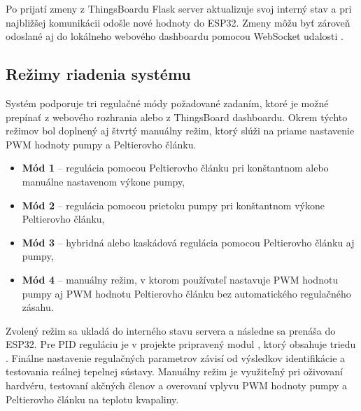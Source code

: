 Po prijatí zmeny z ThingsBoardu Flask server aktualizuje svoj interný stav a pri 
najbližšej komunikácii odošle nové hodnoty do ESP32. Zmeny môžu byť zároveň odoslané 
aj do lokálneho webového dashboardu pomocou WebSocket udalosti .

\subsection{Režimy riadenia systému}

Systém podporuje tri regulačné módy požadované zadaním, ktoré je možné prepínať z webového 
rozhrania alebo z ThingsBoard dashboardu. Okrem týchto režimov bol doplnený aj štvrtý 
manuálny režim, ktorý slúži na priame nastavenie PWM hodnoty pumpy a Peltierovho článku.

\begin{itemize}
    \item \textbf{Mód 1} -- regulácia pomocou Peltierovho článku pri konštantnom alebo manuálne nastavenom výkone pumpy,
    \item \textbf{Mód 2} -- regulácia pomocou prietoku pumpy pri konštantnom výkone Peltierovho článku,
    \item \textbf{Mód 3} -- hybridná alebo kaskádová regulácia pomocou Peltierovho článku aj pumpy,
    \item \textbf{Mód 4} -- manuálny režim, v ktorom používateľ nastavuje PWM hodnotu pumpy aj PWM hodnotu Peltierovho článku bez automatického regulačného zásahu.
\end{itemize}

Zvolený režim sa ukladá do interného stavu servera a následne sa prenáša do ESP32. 
Pre PID reguláciu je v projekte pripravený modul , ktorý obsahuje triedu 
. Finálne nastavenie regulačných parametrov závisí od výsledkov 
identifikácie a testovania reálnej tepelnej sústavy. Manuálny režim je využiteľný pri 
oživovaní hardvéru, testovaní akčných členov a overovaní vplyvu PWM hodnoty pumpy a 
Peltierovho článku na teplotu kvapaliny.
